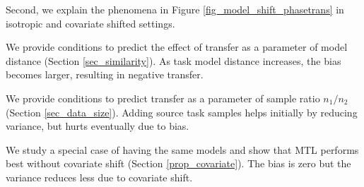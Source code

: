 Second, we explain the phenomena in Figure \ref{fig_model_shift_phasetrans} in isotropic and covariate shifted settings.
\squishlist
	\item We provide conditions to predict the effect of transfer as a parameter of model distance (Section \ref{sec_similarity}).
	As task model distance increases, the bias becomes larger, resulting in negative transfer.
	\item We provide conditions to predict transfer as a parameter of sample ratio $n_1/n_2$ (Section \ref{sec_data_size}).
	Adding source task samples helps initially by reducing variance, but hurts eventually due to bias.
	\item We study a special case of having the same models and show that MTL  performs best without covariate shift (Section \ref{prop_covariate}).
	The bias is zero but the variance reduces less due to covariate shift.
\squishend
